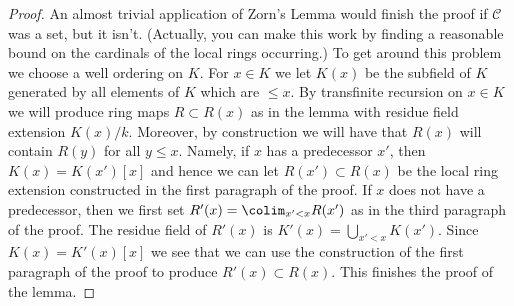 \begin{proof}
\medskip\noindent
An almost trivial application of Zorn's Lemma would finish the proof
if $\mathcal{C}$ was a set, but it isn't.
(Actually, you can make this work by finding a reasonable bound on the
cardinals of the local rings occurring.)
To get around this problem we choose a well ordering on $K$.
For $x \in K$ we let $K(x)$ be the subfield of $K$ generated
by all elements of $K$ which are $\leq x$.
By transfinite recursion on $x \in K$ we will produce ring maps
$R \subset R(x)$ as in the lemma with residue field extension
$K(x)/k$. Moreover, by construction we will have that
$R(x)$ will contain $R(y)$ for all $y \leq x$.
Namely, if $x$ has a predecessor $x'$, then $K(x) = K(x')[x]$
and hence we can let $R(x') \subset R(x)$ be the local ring extension
constructed in the first paragraph of the proof. If $x$ does not
have a predecessor, then we first set
$R'(x) = \colim_{x' < x} R(x')$ as in the third paragraph
of the proof. The residue field of $R'(x)$ is $K'(x) = \bigcup_{x' < x} K(x')$.
Since $K(x) = K'(x)[x]$ we see that we can use the construction of the
first paragraph of the proof to produce $R'(x) \subset R(x)$.
This finishes the proof of the lemma.
\end{proof}